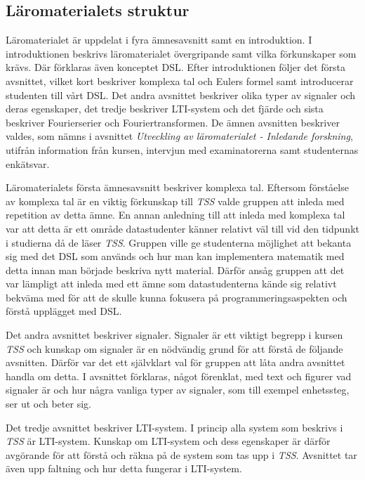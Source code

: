 \documentclass[]{article}
\begin{document}
\subsection{Läromaterialets struktur}

Läromaterialet är uppdelat i fyra ämnesavsnitt samt en introduktion. I introduktionen beskrivs läromaterialet
övergripande samt vilka förkunskaper som krävs. Där förklaras även konceptet DSL. Efter introduktionen följer det
första avsnittet, vilket kort beskriver komplexa tal och Eulers formel samt introducerar studenten till vårt DSL. Det
andra avsnittet beskriver olika typer av signaler och deras egenskaper, det tredje beskriver LTI-system och det fjärde
och sista beskriver Fourierserier och Fouriertransformen. De ämnen avsnitten beskriver valdes, som nämns i avsnittet
\textit{Utveckling av läromaterialet - Inledande forskning}, utifrån information från kursen, intervjun med
examinatorerna samt studenternas enkätsvar.

Läromaterialets första ämnesavsnitt beskriver komplexa tal. Eftersom förståelse av komplexa tal är en viktig förkunskap
till \textit{TSS} valde gruppen att inleda med repetition av detta ämne. En annan anledning till att inleda med komplexa
tal var att detta är ett område datastudenter känner relativt väl till vid den tidpunkt i studierna då de läser
\textit{TSS}. Gruppen ville ge studenterna möjlighet att bekanta sig med det DSL som används och hur man kan
implementera matematik med detta innan man började beskriva nytt material. Därför ansåg gruppen att det var lämpligt att
inleda med ett ämne som datastudenterna kände sig relativt bekväma med för att de skulle kunna fokusera på
programmeringsaspekten och förstå upplägget med DSL.

Det andra avsnittet beskriver signaler. Signaler är ett viktigt begrepp i kursen \textit{TSS} och kunskap om signaler är
en nödvändig grund för att förstå de följande avsnitten. Därför var det ett självklart val för gruppen att låta andra
avsnittet handla om detta. I avsnittet förklaras, något förenklat, med text och figurer vad signaler är och hur några
vanliga typer av signaler, som till exempel enhetssteg, ser ut och beter sig.

Det tredje avsnittet beskriver LTI-system. I princip alla system som beskrivs i \textit{TSS} är LTI-system. Kunskap om LTI-system
och dess egenskaper är därför avgörande för att förstå och räkna på de system som tas upp i \textit{TSS}. Avsnittet tar
även upp faltning och hur detta fungerar i LTI-system.
\end{document}
